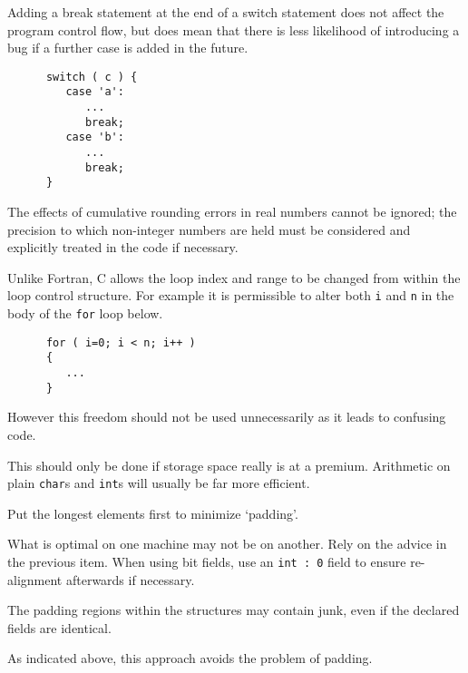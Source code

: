 Adding a break statement at the end of a switch statement does not
affect the program control flow, but does mean that there
is less likelihood of introducing a bug if a further case is added
in the future. 
\begin{verbatim}
      switch ( c ) {
         case 'a':
            ...
            break;
         case 'b':
            ...
            break;
      }
\end{verbatim}


The effects of cumulative rounding errors in real numbers cannot be ignored; 
the precision to which non-integer numbers are held must be considered and 
explicitly treated in the code if necessary.


Unlike Fortran, C allows the loop index  and range to be changed 
from within the loop control structure.
For example it is permissible to alter both {\tt i} and {\tt n}
in the body of the {\tt for} loop below.
\begin{verbatim}
      for ( i=0; i < n; i++ )
      {                       
         ...
      }
\end{verbatim}          
However this freedom should not be used unnecessarily as it leads to 
confusing code.



This should only be done if storage space  
really is at a premium. Arithmetic on plain \verb~char~s and 
\verb~int~s will usually be far more efficient.

Put the longest elements first to minimize `padding'.

What is optimal on one machine may not be on another. Rely 
on the advice in the previous item.
When using bit fields, use an {\tt int~:~0}
field to ensure re-alignment afterwards if necessary.



The padding regions within the structures may 
contain junk, even if the declared fields are identical.

As indicated above, this approach avoids the problem of padding.


